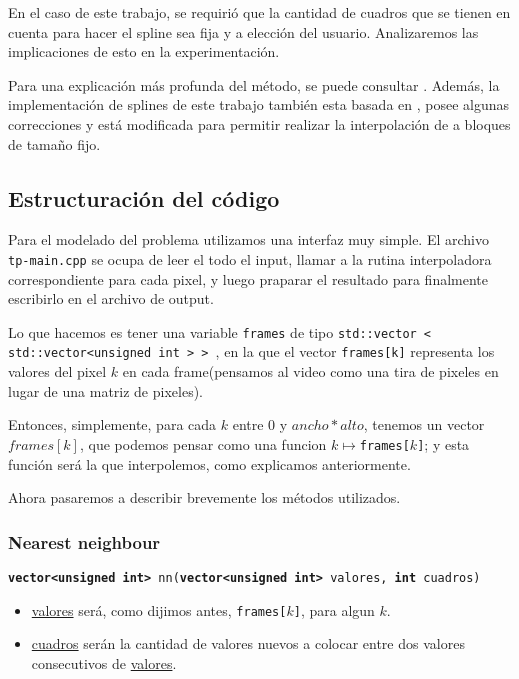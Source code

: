 En el caso de este trabajo, se requirió que la cantidad de cuadros que se tienen en cuenta para hacer el spline sea fija y a elección del usuario. Analizaremos las implicaciones de esto en la experimentación.

Para una explicación más profunda del método, se puede consultar \cite{burden}. Además, la implementación de splines de este trabajo también esta basada en \cite{burden}, posee algunas correcciones y está modificada para permitir realizar la interpolación de a bloques de tamaño fijo.


\subsection{Estructuración del código}

Para el modelado del problema utilizamos una interfaz muy simple. El archivo \texttt{tp-main.cpp} se ocupa de leer el todo el input, llamar a la rutina interpoladora correspondiente para cada pixel, y luego praparar el resultado para finalmente escribirlo en el archivo de output.

Lo que hacemos es tener una variable \texttt{frames} de tipo \texttt{std::vector < std::vector<unsigned int > {} > }, en la que el vector \texttt{frames[k]} representa los valores del pixel $k$ en cada frame(pensamos al video como una tira de pixeles en lugar de una matriz de pixeles).


Entonces, simplemente, para cada $k$ entre 0 y $ancho * alto$, tenemos un vector $frames[k]$, que podemos pensar como una funcion $ k \mapsto $\texttt{frames[$k$]}; y esta función será la que interpolemos, como explicamos anteriormente.

Ahora pasaremos a describir brevemente los métodos utilizados.


\subsubsection{Nearest neighbour}
\texttt{\textbf{vector<unsigned int>} nn(\textbf{vector<unsigned int>} valores, \textbf{int} cuadros)}

\begin{itemize}
    \item  \underline{valores} será, como dijimos antes, \texttt{frames[$k$]}, para algun $k$.
    \item \underline{cuadros} serán la cantidad de valores nuevos a colocar entre dos valores consecutivos de \underline{valores}.
\end{itemize}

